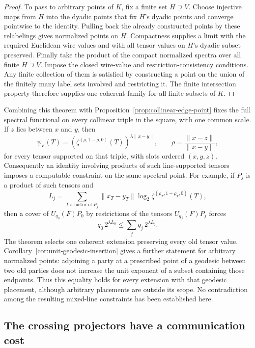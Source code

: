 \begin{proof}
To pass to arbitrary points of $K$, fix a finite set $H\supseteq V$.  Choose injective maps from $H$ into the dyadic points that fix $H$'s dyadic points and converge pointwise to the identity.  Pulling back the already constructed points by these relabelings gives normalized points on $H$.  Compactness supplies a limit with the required Euclidean wire values and with all tensor values on $H$'s dyadic subset preserved.  Finally take the product of the compact normalized spectra over all finite $H\supseteq V$.  Impose the closed wire-value and restriction-consistency conditions.  Any finite collection of them is satisfied by constructing a point on the union of the finitely many label sets involved and restricting it.  The finite intersection property therefore supplies one coherent family for all finite subsets of $K$.
\end{proof}

Combining this theorem with Proposition~\ref{prop:collinear-edge-point} fixes the full spectral functional on every collinear triple in the square, with one common scale.  If $z$ lies between $x$ and $y$, then
\[
 \psi_F(T)=\left(\zeta^{(\rho,1-\rho,0)}(T)\right)^{\lambda\|x-y\|},
 \qquad \rho=\frac{\|x-z\|}{\|x-y\|},
\]
for every tensor supported on that triple, with slots ordered $(x,y,z)$.  Consequently an identity involving products of such line-supported tensors imposes a computable constraint on the same spectral point.  For example, if $P_j$ is a product of such tensors and
\[
 L_j=\sum_{T\text{ a factor of }P_j}\|x_T-y_T\|
       \log_2\zeta^{(\rho_T,1-\rho_T,0)}(T),
\]
then a cover of $U_{q_0}(F)P_0$ by restrictions of the tensors $U_{q_j}(F)P_j$ forces
\[
 q_0\,2^{\lambda L_0}\leq\sum_j q_j\,2^{\lambda L_j}.
\]
The theorem selects one coherent extension preserving every old tensor value.  Corollary~\ref{cor:unit-geodesic-insertion} gives a further statement for arbitrary normalized points: adjoining a party at a prescribed point of a geodesic between two old parties does not increase the unit exponent of a subset containing those endpoints.  Thus this equality holds for every extension with that geodesic placement, although arbitrary placements are outside its scope.  No contradiction among the resulting mixed-line constraints has been established here.

\subsection{The crossing projectors have a communication cost}

